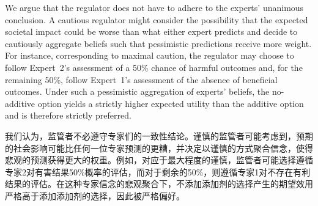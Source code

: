 \documentclass[12pt,a4paper]{article}
\newenvironment{original}
  {\par\noindent\ignorespaces}
  {\par}
\newenvironment{translation}
  {\par\noindent{\color{transblue}\ignorespaces}}
  {\par\medskip}
\begin{document}
\begin{original}
We argue that the regulator does not have to adhere to the experts' unanimous conclusion. A cautious regulator might consider the possibility that the expected societal impact could be worse than what either expert predicts and decide to cautiously aggregate beliefs such that pessimistic predictions receive more weight. For instance, corresponding to maximal caution, the regulator may choose to follow Expert~2's assessment of a 50\% chance of harmful outcomes and, for the remaining 50\%, follow Expert~1's assessment of the absence of beneficial outcomes. Under such a pessimistic aggregation of experts' beliefs, the no-additive option yields a strictly higher expected utility than the additive option and is therefore strictly preferred.
\end{original}

\begin{translation}
我们认为，监管者不必遵守专家们的一致性结论。谨慎的监管者可能考虑到，预期的社会影响可能比任何一位专家预测的更糟，并决定以谨慎的方式聚合信念，使得悲观的预测获得更大的权重。例如，对应于最大程度的谨慎，监管者可能选择遵循专家2对有害结果50\%概率的评估，而对于剩余的50\%，则遵循专家1对不存在有利结果的评估。在这种专家信念的悲观聚合下，不添加添加剂的选择产生的期望效用严格高于添加添加剂的选择，因此被严格偏好。
\end{translation}
\end{document}
